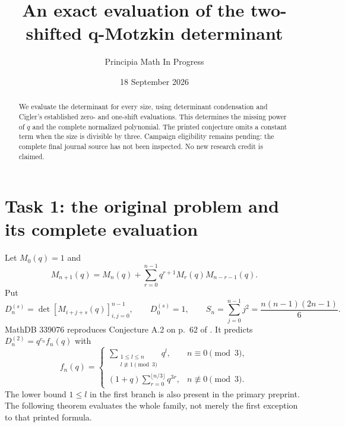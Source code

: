 \documentclass[11pt]{article}
\title{An exact evaluation of the two-shifted q-Motzkin determinant}
\author{Principia Math In Progress}
\date{18 September 2026}
\begin{document}
\maketitle
\begin{abstract}
We evaluate the determinant for every size, using determinant condensation
and Cigler's established zero- and one-shift evaluations. This determines
the missing power of \(q\) and the complete normalized polynomial.
The printed conjecture omits a constant term when the size is divisible
by three. Campaign eligibility remains pending: the complete final
journal source has not been inspected. No new research credit is claimed.
\end{abstract}

\section*{Task 1: the original problem and its complete evaluation}
Let \(M_0(q)=1\) and
\[
 M_{n+1}(q)=M_n(q)+
       \sum_{r=0}^{n-1}q^{r+1}M_r(q)M_{n-r-1}(q).
\]
Put
\[
 D_n^{(s)}=\det[M_{i+j+s}(q)]_{i,j=0}^{n-1},
 \qquad D_0^{(s)}=1,\qquad
 S_n=\sum_{j=0}^{n-1}j^2=\frac{n(n-1)(2n-1)}6 .
\]
MathDB 339076 reproduces Conjecture A.2 on p.~62 of
\cite{OS}. It predicts \(D_n^{(2)}=q^{c_n}f_n(q)\) with
\[
 f_n(q)=
 \begin{cases}
 \displaystyle\sum_{\substack{1\le l\le n\\l\not\equiv1\pmod3}}q^l,
                    &n\equiv0\pmod3,\\[5pt]
 \displaystyle(1+q)\sum_{r=0}^{\lfloor n/3\rfloor}q^{3r},
                    &n\not\equiv0\pmod3.
 \end{cases}
\]
The lower bound \(1\le l\) in the first branch is also present in the
primary preprint. The following theorem evaluates the whole family,
not merely the first exception to that printed formula.
\end{document}
